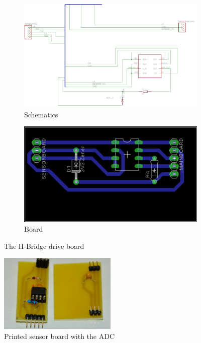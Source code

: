 \begin{figure}[!ht]
	\begin{subfigure}{.49\textwidth}
		\centering
		\includegraphics[width=1\textwidth]{figures/sensorrSCH}
		\caption{Schematics}
		\label{fig:sensorSCH}
	\end{subfigure}
	\begin{subfigure}{.49\textwidth}
		\centering
		\includegraphics[width=1\textwidth]{figures/sensorrBRD}
		\caption{Board}
		\label{fig:sensorBRD}
	\end{subfigure}
\caption{The H-Bridge drive board}
\label{fig:sensorr}
\end{figure}

\begin{figure}[!ht]
	\centering
	\includegraphics[width=0.5\textwidth]{figures/printsensor}
	\caption{Printed sensor board with the ADC}
	\label{fig:printsensor}
\end{figure}

